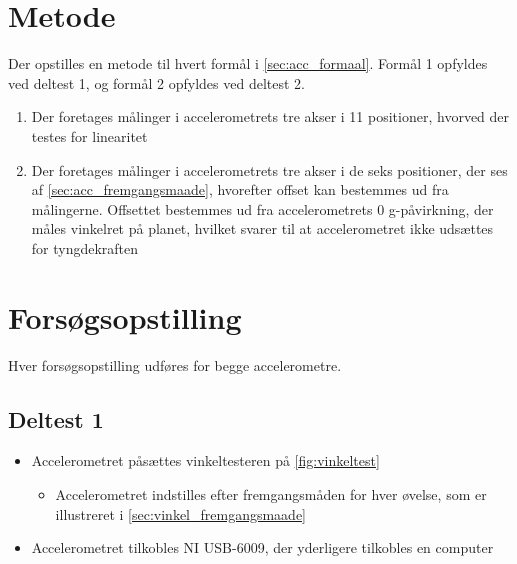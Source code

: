 \section{Metode}
Der opstilles en metode til hvert formål i \autoref{sec:acc_formaal}. Formål 1 opfyldes ved deltest 1, og formål 2 opfyldes ved deltest 2.
\begin{enumerate}
\item Der foretages målinger i accelerometrets tre akser i 11 positioner, hvorved der testes for linearitet
\item Der foretages målinger i accelerometrets tre akser i de seks positioner, der ses af \autoref{sec:acc_fremgangsmaade}, hvorefter offset kan bestemmes ud fra målingerne. Offsettet bestemmes ud fra accelerometrets 0 g-påvirkning, der måles vinkelret på planet, hvilket svarer til at accelerometret ikke udsættes for tyngdekraften
\end{enumerate}

\section{Forsøgsopstilling}
Hver forsøgsopstilling udføres for begge accelerometre.

\subsection{Deltest 1}
\begin{itemize}
\item Accelerometret påsættes vinkeltesteren på \autoref{fig:vinkeltest}
\begin{itemize}
\item Accelerometret indstilles efter fremgangsmåden for hver øvelse, som er illustreret i \autoref{sec:vinkel_fremgangsmaade}
\end{itemize}
\item Accelerometret tilkobles NI USB-6009, der yderligere tilkobles en computer
\end{itemize}

